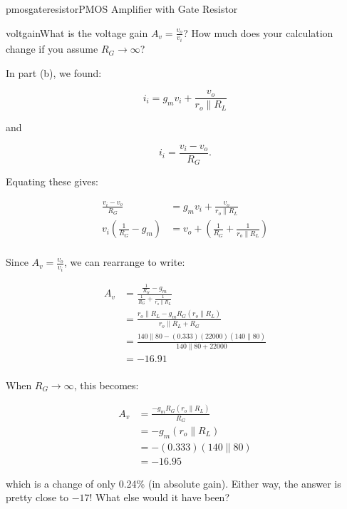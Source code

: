 \begin{mainquestion}{pmosgateresistor}{PMOS Amplifier with Gate Resistor}
\begin{partquestion}{voltgain}{What is the voltage gain $A_{v} = \frac{v_{o}}{v_{i}}$? How much does your calculation change if you assume $R_{G} \rightarrow \infty$?}
\begin{answer}
In part (b), we found:

\[
i_{i} = g_{m}v_{i} + \frac{v_{o}}{r_{o} \parallel R_{L}}
\]

and

\[
i_{i} = \frac{v_{i} - v_{o}}{R_{G}}.
\]

Equating these gives:

\begin{align*}
    \frac{v_i - v_o}{R_G} &= g_m v_i + \frac{v_o}{r_o \parallel R_L} \\
    v_i\left(\frac{1}{R_G} - g_m\right) &= v_o + \left(\frac{1}{R_G} + \frac{1}{r_o \parallel R_L}\right) \\
\end{align*}

Since $A_{v} = \frac{v_{o}}{v_{i}}$, we can rearrange to write:

\begin{align*}
    A_v &= \frac{\frac{1}{R_G} - g_m}{\frac{1}{R_G} + \frac{1}{r_o \parallel R_L}} \\
    &= \frac{r_o \parallel R_L - g_m R_G(r_o \parallel R_L)}{r_o \parallel R_L + R_G} \\
    &= \frac{140 \parallel 80 - (0.333) (22000) (140 \parallel 80)}{140 \parallel 80 + 22000} \\
    &= -16.91 \\
\end{align*}

When $R_{G} \rightarrow \infty$, this becomes:

\begin{align*}
    A_v &= \frac{-g_m R_G (r_o \parallel R_L)}{R_G} \\
    &= -g_m (r_o \parallel R_L) \\
    &= -(0.333) (140 \parallel 80) \\
    &= -16.95
\end{align*}

which is a change of only 0.24\% (in absolute gain). Either way, the answer is pretty close to $-17$! What else would it have been?
\end{answer}
\end{partquestion}

\end{mainquestion}
